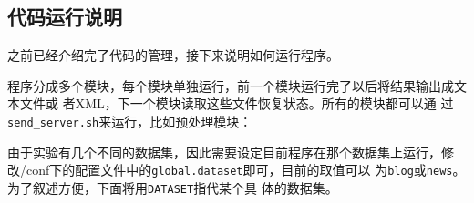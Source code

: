 \documentclass{article}
\begin{document}
\subsection{代码运行说明}
\label{sec:code}
之前已经介绍完了代码的管理，接下来说明如何运行程序。

程序分成多个模块，每个模块单独运行，前一个模块运行完了以后将结果输出成文本文件或
者XML，下一个模块读取这些文件恢复状态。所有的模块都可以通
过\texttt{send\_server.sh}来运行，比如预处理模块：\\

由于实验有几个不同的数据集，因此需要设定目前程序在那个数据集上运行，修
改\prj/conf下的配置文件中的\texttt{global.dataset}即可，目前的取值可以
为\texttt{blog}或\texttt{news}。为了叙述方便，下面将用\texttt{DATASET}指代某个具
体的数据集。
\end{document}
